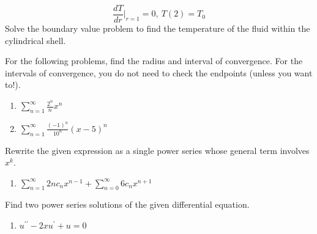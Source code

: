 \begin{fullwidth}
\begin{enumerate}[resume]
\begin{equation*}
\frac{dT}{dr}\Bigr|_{r=1} = 0, \ T(2)=T_0
\end{equation*}
Solve the boundary value problem to find the temperature of the fluid within the cylindrical shell.

\vspace{5.0cm}

\end{enumerate}

\noindent For the following problems, find the radius and interval of convergence.  For the intervals of convergence, you do not need to check the endpoints (unless you want to!).
\begin{enumerate}[resume]
\item $\sum\limits_{n=1}^{\infty} \frac{2^n}{n}x^n$

\vspace{1.0cm}

\item $\sum\limits_{n=1}^{\infty}\frac{(-1)^n}{10^n}(x-5)^n$

\vspace{1.0cm}

\end{enumerate}

\noindent Rewrite the given expression as a single power series whose general term involves $x^k$.
\begin{enumerate}[resume]
\item $\sum\limits_{n=1}^{\infty}2nc_nx^{n-1} + \sum\limits_{n=0}^{\infty}6c_nx^{n+1}$

\vspace{1.0cm}

\end{enumerate}

\noindent Find two power series solutions of the given differential equation.

\begin{enumerate}[resume]
\item $u^{\prime \prime}-2xu^{\prime} + u = 0$

\vspace{1.0cm}
\end{enumerate}




\end{fullwidth}
